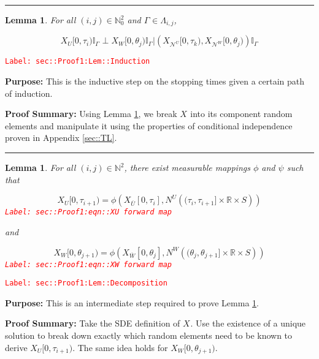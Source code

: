 \documentclass[12pt]{article}
\newcommand{\mb}{\mathbb}
\newcommand{\mc}{\mathcal}
\newcommand{\ov}{\overline}
\newcommand{\tr}{\textcolor{red}}
\newcommand{\labe}[1]{\tr{\texttt{Label: #1}}}
\newcommand{\purpose}{\textbf{Purpose: }}
\newcommand{\pfsum}{\textbf{Proof Summary: }}
\newcommand{\lin}{\rule{\linewidth}{0.4 pt}}
\renewcommand{\U}{U}							%
\newcommand{\UU}{W}								%
\renewcommand{\S}{S}							%
\newcommand{\X}{X}								%
\newcommand{\neigh}{\mc{N}}						%
\newcommand{\vind}[1]{^{#1}}					%
\newcommand{\cind}[1]{_{#1}}					%
\newcommand{\cl}{\ov}							%
\newcommand{\tip}[1]{#1}						%
\newcommand{\poiss}{N}							%
\newcommand{\indx}[1]{_{#1}}					%
\newcommand{\rt}{\tau}							%
\newcommand{\rtt}{\theta}						%
\renewcommand{\it}{k}							%
\newcommand{\apath}{\Gamma}						%
\newcommand{\pathset}[2]{\Lambda_{#1,#2}}		%
\newtheorem{lem}[thms]{Lemma}
\begin{document}
\lin

\begin{lem}
For all \((i,j)\in \mb{N}_0^2\) and \(\apath\indx{} \in \pathset{i}{j}\),

\[\X\cind{\U}\tip{[0,\rt\indx{i})}\mb{I}_{\apath\indx{}}\perp \X\cind{\UU}\tip{[0,\rtt\indx{j})}\mb{I}_{\apath\indx{}}|\left(\X\cind{\neigh\vind{\U}}\tip{[0,\rt\indx{\it})},\X\cind{\neigh\vind{\UU}}\tip{[0,\rtt\indx{j})}\right)\mb{I}_{\apath\indx{}}\]
\label{sec::Proof1:Lem::Induction}
\end{lem}
\labe{sec::Proof1:Lem::Induction}

\purpose This is the inductive step on the stopping times given a certain path of induction.

\pfsum Using Lemma \ref{sec::Proof1:Lem::Decomposition}, we break \(\X\cind{}\tip{}\) into its component random elements and manipulate it using the properties of conditional independence proven in Appendix \ref{sec::TL}.

\lin

\begin{lem}
For all \((i,j)\in \mb{N}^2\), there exist measurable mappings \(\phi\) and \(\psi\) such that 

\begin{equation}
\X\cind{\U}\tip{[0,\rt\indx{i+1})} = \phi\left(\X\cind{\cl{\U}}\tip{[0,\rt\indx{i}]}, \poiss\vind{\U}\left((\rt\indx{i}, \rt\indx{i+1}]\times \mb{R}\times \S\right)\right)
\label{sec::Proof1:eqn::XU forward map}
\end{equation}
\labe{sec::Proof1:eqn::XU forward map}

and

\begin{equation}
\X\cind{\UU}\tip{[0,\rtt\indx{j+1})} = \phi\left(\X\cind{\cl{\UU}}\tip{[0,\rtt\indx{j}]}, \poiss\vind{\UU}\left((\rtt\indx{j}, \rtt\indx{j+1}]\times \mb{R}\times \S\right)\right)
\label{sec::Proof1:eqn::XW forward map}
\end{equation}
\labe{sec::Proof1:eqn::XW forward map}

\label{sec::Proof1:Lem::Decomposition}
\end{lem}
\labe{sec::Proof1:Lem::Decomposition}

\purpose This is an intermediate step required to prove Lemma \ref{sec::Proof1:Lem::Induction}.

\pfsum Take the SDE definition of \(\X\cind{}\tip{}\). Use the existence of a unique solution to break down exactly which random elements need to be known to derive \(\X\cind{\U}\tip{[0,\rt\indx{i+1})}\). The same idea holds for \(\X\cind{\UU}\tip{[0,\rtt\indx{j+1})}\).
\end{document}
